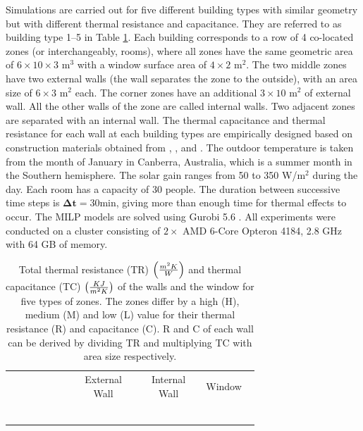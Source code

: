 Simulations are carried out for five different building types with similar geometry but with different thermal resistance and capacitance. They are referred to as building type 1--5 in Table \ref{tab:rc_wall_win}. Each building corresponds to a row of 4 co-located zones (or interchangeably, rooms), where all zones have the same geometric area of $6\times 10\times 3 \mbox{ m}^3$ with a window surface area of $4\times 2    \mbox{ m}^2$. The two middle zones have two external walls (the wall separates the zone to the outside), with an area size of $6\times 3 \mbox{ m}^2$ each. The corner zones have an additional $3\times 10 \mbox{ m}^2$ of external wall. All the other walls of the zone are called internal walls. Two adjacent zones are separated with an internal wall. The thermal capacitance and thermal resistance for each wall at each building types are empirically designed based on construction materials obtained from \cite{gouda2000low}, \cite{gouda2002building}, \cite{goyal2013occupancy} and \cite{ashrae2013fund}. The outdoor temperature is taken from the month of January in Canberra, Australia, which is a summer month in the Southern hemisphere. The solar gain ranges from 50 to 350 W/m$^2$ during the day. Each room has a capacity of 30 people. The duration between successive time steps is $\bm{\Delta t} = 30$min, giving more than enough time for thermal effects to occur.  The MILP models are solved using Gurobi 5.6 \citep{gurobi}. All experiments were conducted on a cluster consisting of $2\times$ AMD 6-Core Opteron 4184, 2.8 GHz with 64 GB of memory.

\begin{table}[t]
\centering
\begin{tabular}{p{0.2\linewidth} p{0.1\linewidth} p{0.1\linewidth}  p{0.1\linewidth} p{0.1\linewidth} p{0.1\linewidth}}
\hline\centering{Building Types} & \multicolumn{2}{c}{External Wall} & \multicolumn{2}{c}{Internal Wall} & {Window} \tabularnewline
       & \centering{(TR)} & \centering{(TC)} & \centering{(TR)} & \centering{(TC)} & \centering{(TR)} \tabularnewline
\hline \centering{1 (LRLC)} & \centering{3} & \centering{120} & \centering{1.5} & \centering{120} & \centering{0.5} \tabularnewline
\hline \centering{2 (MRMC)} & \centering{3} & \centering{140} & \centering{1.5} & \centering{140} & \centering{0.5} \tabularnewline
\hline \centering{3 (LRHC)} & \centering{3} & \centering{240} & \centering{1.5} & \centering{240} & \centering{0.5} \tabularnewline
\hline \centering{4 (HRLC)} & \centering{6} & \centering{120} & \centering{3} & \centering{120} & \centering{0.5} \tabularnewline
\hline \centering{5 (HRHC)} & \centering{6} & \centering{240} & \centering{3} & \centering{240} & \centering{0.5} \tabularnewline
\end{tabular}
	\caption{Total thermal resistance (TR) $\left( m^2 K\over W\right)$ and thermal capacitance (TC) $\left( KJ \over m^2K \right)$ of the walls and the window for five types of zones. The zones differ by a high (H), medium (M) and low (L) value for their thermal resistance (R) and capacitance (C). R and C of each wall can be derived by dividing TR and multiplying TC with area size respectively.}
	\label{tab:rc_wall_win}
\end{table}



